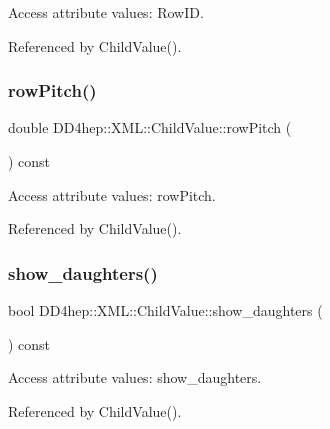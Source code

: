 Access attribute values\+: Row\+ID. 



Referenced by Child\+Value().

\hypertarget{struct_d_d4hep_1_1_x_m_l_1_1_child_value_a11129d15727a7490abcba854ef7af373}{}\label{struct_d_d4hep_1_1_x_m_l_1_1_child_value_a11129d15727a7490abcba854ef7af373} 
\subsubsection{\texorpdfstring{row\+Pitch()}{rowPitch()}}
{\footnotesize\ttfamily double D\+D4hep\+::\+X\+M\+L\+::\+Child\+Value\+::row\+Pitch (\begin{DoxyParamCaption}{ }\end{DoxyParamCaption}) const}



Access attribute values\+: row\+Pitch. 



Referenced by Child\+Value().

\hypertarget{struct_d_d4hep_1_1_x_m_l_1_1_child_value_a4f0ed3b9ea2ee928df1fc69c1b50b27d}{}\label{struct_d_d4hep_1_1_x_m_l_1_1_child_value_a4f0ed3b9ea2ee928df1fc69c1b50b27d} 
\subsubsection{\texorpdfstring{show\+\_\+daughters()}{show\_daughters()}}
{\footnotesize\ttfamily bool D\+D4hep\+::\+X\+M\+L\+::\+Child\+Value\+::show\+\_\+daughters (\begin{DoxyParamCaption}{ }\end{DoxyParamCaption}) const}



Access attribute values\+: show\+\_\+daughters. 



Referenced by Child\+Value().

\hypertarget{struct_d_d4hep_1_1_x_m_l_1_1_child_value_a2b05182b7406fbdaf4e823cba9a10ae5}{}\label{struct_d_d4hep_1_1_x_m_l_1_1_child_value_a2b05182b7406fbdaf4e823cba9a10ae5} 
